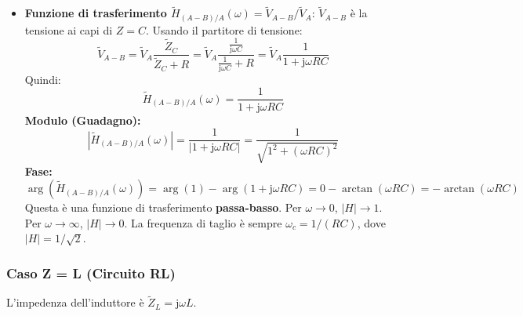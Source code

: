 \documentclass[a4paper, 11pt]{article}
\newcommand{\jj}{\mathrm{j}} %
\newcommand{\abs}[1]{\left|#1\right|}
\newcommand{\argum}[1]{\arg\left(#1\right)}
\begin{document}
\begin{itemize}
    \item \textbf{Funzione di trasferimento $\tilde{H}_{(A-B)/A}(\omega) = \tilde{V}_{A-B} / \tilde{V}_A$}:
        $\tilde{V}_{A-B}$ è la tensione ai capi di $Z=C$. Usando il partitore di tensione:
        \begin{equation}
            \tilde{V}_{A-B} = \tilde{V}_A \frac{\tilde{Z}_C}{\tilde{Z}_C + R} = \tilde{V}_A \frac{\frac{1}{\jj \omega C}}{\frac{1}{\jj \omega C} + R} = \tilde{V}_A \frac{1}{1 + \jj \omega R C}
        \end{equation}
        Quindi:
        \begin{equation} \label{eq:H_RC_VABVA}
            \tilde{H}_{(A-B)/A}(\omega) = \frac{1}{1 + \jj \omega R C}
        \end{equation}
        \textbf{Modulo (Guadagno):}
        \begin{equation}
            \abs{\tilde{H}_{(A-B)/A}(\omega)} = \frac{1}{\abs{1 + \jj \omega R C}} = \frac{1}{\sqrt{1^2 + (\omega R C)^2}}
        \end{equation}
        \textbf{Fase:}
        \begin{equation}
            \argum{\tilde{H}_{(A-B)/A}(\omega)} = \argum{1} - \argum{1 + \jj \omega R C} = 0 - \arctan(\omega R C) = -\arctan(\omega R C)
        \end{equation}
        Questa è una funzione di trasferimento \textbf{passa-basso}. Per $\omega \to 0$, $\abs{H} \to 1$. Per $\omega \to \infty$, $\abs{H} \to 0$. La frequenza di taglio è sempre $\omega_c = 1/(RC)$, dove $\abs{H} = 1/\sqrt{2}$.
\end{itemize}

\subsubsection{Caso Z = L (Circuito RL)}
L'impedenza dell'induttore è $\tilde{Z}_L = \jj \omega L$.
\end{document}

